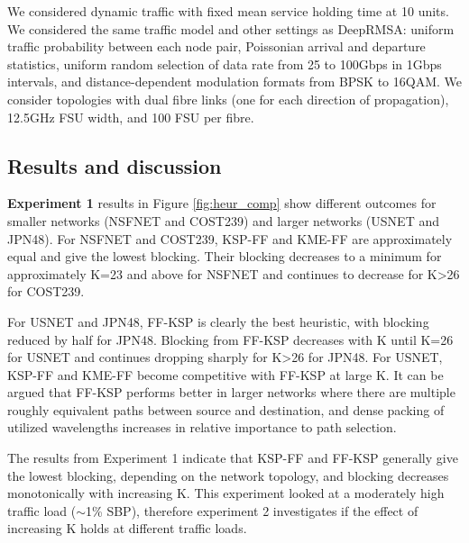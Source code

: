 We considered dynamic traffic with fixed mean service holding time at 10 units. We considered the same traffic model and other settings as DeepRMSA\footnotemark: uniform traffic probability between each node pair, Poissonian arrival and departure statistics, uniform random selection of data rate from 25 to 100Gbps in 1Gbps intervals, and distance-dependent modulation formats from BPSK to 16QAM. We consider topologies with dual fibre links (one for each direction of propagation), 12.5GHz FSU width, and 100 FSU per fibre.


\subsection{Results and discussion}

\textbf{Experiment 1} results in Figure \ref{fig:heur_comp} show different outcomes for smaller networks (NSFNET and COST239) and larger networks (USNET and JPN48). For NSFNET and COST239, KSP-FF and KME-FF are approximately equal and give the lowest blocking. Their blocking decreases to a minimum for approximately K=23 and above for NSFNET and continues to decrease for K>26 for COST239.

For USNET and JPN48, FF-KSP is clearly the best heuristic, with blocking reduced by half for JPN48. Blocking from FF-KSP decreases with K until K=26 for USNET and continues dropping sharply for K>26 for JPN48. For USNET, KSP-FF and KME-FF become competitive with FF-KSP at large K. It can be argued that FF-KSP performs better in larger networks where there are multiple roughly equivalent paths between source and destination, and dense packing of utilized wavelengths increases in relative importance to path selection.

The results from Experiment 1 indicate that KSP-FF and FF-KSP generally give the lowest blocking, depending on the network topology, and blocking decreases monotonically with increasing K. This experiment looked at a moderately high traffic load ($\sim$1\% SBP), therefore experiment 2 investigates if the effect of increasing K holds at different traffic loads. 


